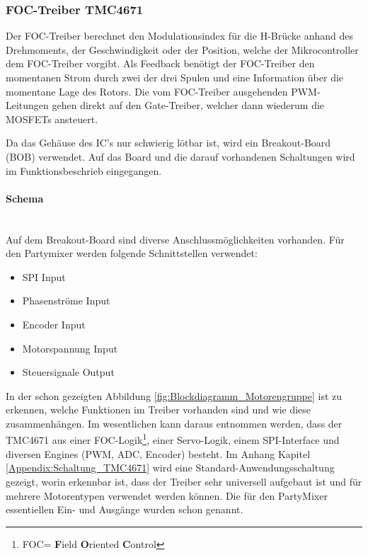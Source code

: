 \subsubsection{FOC-Treiber TMC4671}
\label{subsubsec:FOC-Treiber_TMC4671}

Der FOC-Treiber berechnet den Modulationsindex für die H-Brücke anhand des Drehmoments, der Geschwindigkeit oder der Position, welche der Mikrocontroller dem FOC-Treiber vorgibt. Als Feedback benötigt der FOC-Treiber den momentanen Strom durch zwei der drei Spulen und eine Information über die momentane Lage des Rotors. Die vom FOC-Treiber ausgehenden PWM-Leitungen gehen direkt auf den Gate-Treiber, welcher dann wiederum die MOSFETs ansteuert.

Da das Gehäuse des IC's nur schwierig lötbar ist, wird ein Breakout-Board (BOB) verwendet.
Auf das Board und die darauf vorhandenen Schaltungen wird im Funktionsbeschrieb eingegangen.
\newpage
\paragraph{Schema}\label{par:Schaltungsaufbau_TMC4671}\mbox{}\\

Auf dem Breakout-Board sind diverse Anschlussmöglichkeiten vorhanden. Für den Partymixer werden folgende Schnittstellen verwendet:

\begin{itemize}
\item SPI Input
\item Phasenströme Input
\item Encoder Input
\item Motorspannung Input
\item Steuersignale Output
\end{itemize}

In der schon gezeigten Abbildung \ref{fig:Blockdiagramm_Motorengruppe} ist zu erkennen, welche Funktionen im Treiber vorhanden sind und wie diese zusammenhängen. Im wesentlichen kann daraus entnommen werden, dass der TMC4671 aus einer FOC-Logik\footnote{FOC= \textbf{F}ield \textbf{O}riented \textbf{C}ontrol}, einer Servo-Logik, einem SPI-Interface und diversen Engines (PWM, ADC, Encoder) besteht. Im Anhang Kapitel \ref{Appendix:Schaltung_TMC4671} wird eine Standard-Anwendungsschaltung gezeigt, worin erkennbar ist, dass der Treiber sehr universell aufgebaut ist und für mehrere Motorentypen verwendet werden können. Die für den PartyMixer essentiellen Ein- und Ausgänge wurden schon genannt.

